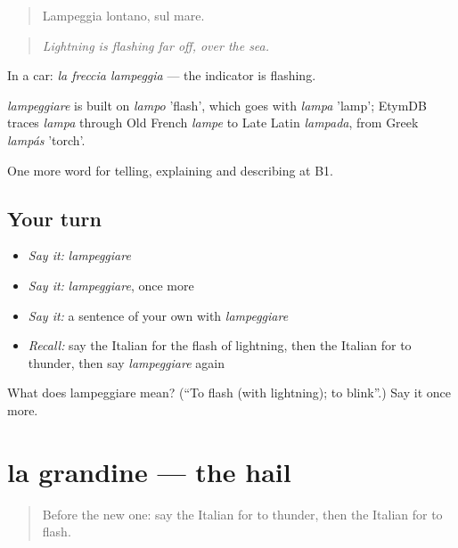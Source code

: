 \begin{quote}
Lampeggia lontano, sul mare.
\end{quote}

\begin{quote}
\emph{Lightning is flashing far off, over the sea.}
\end{quote}

In a car: \emph{la freccia lampeggia} — the indicator is flashing.

\begin{cousinweb}
\emph{lampeggiare} is built on \emph{lampo} 'flash', which goes with \emph{lampa} 'lamp'; EtymDB traces \emph{lampa} through Old French \emph{lampe} to Late Latin \emph{lampada}, from Greek \emph{lampás} 'torch'.
\end{cousinweb}

\begin{grammarlens}[title={What you've built}]
One more word for telling, explaining and describing at B1.
\end{grammarlens}

\subsection*{Your turn}
\begin{itemize}
\raggedright
  \item \emph{Say it:} \emph{lampeggiare}
  \item \emph{Say it:} \emph{lampeggiare}, once more
  \item \emph{Say it:} a sentence of your own with \emph{lampeggiare}
  \item \emph{Recall:} say the Italian for the flash of lightning, then the Italian for to thunder, then say \emph{lampeggiare} again
\end{itemize}

\begin{tcolorbox}[breakable,colback=teal!4,colframe=teal!35!black,title={Before you move on}]
What does lampeggiare mean? (\textquotedblleft{}To flash (with lightning); to blink\textquotedblright{}.) Say it once more.
\end{tcolorbox}
\section[la grandine]{la grandine — the hail}

\label{lesson:IT-C467-grandine}



\begin{quote}
Before the new one: say the Italian for to thunder, then the Italian for to flash.
\end{quote}

